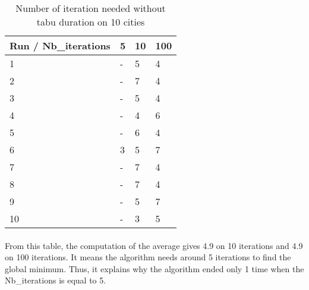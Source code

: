 \documentclass[12pt,oneside,a4paper]{article}
\begin{document}
\begin{table}[h]
    \centering
    \small
    \begin{tabular}{llll}
      \hline
      \multicolumn{1}{|l|}{\textbf{Run / Nb\_iterations}}& \multicolumn{1}{l|}{\textbf{5}} & \multicolumn{1}{l|}{\textbf{10}} & \multicolumn{1}{l|}{\textbf{100}}\\ \hline
      \multicolumn{1}{|l|}{1} & \multicolumn{1}{l|}{-}  & \multicolumn{1}{l|}{5}  & \multicolumn{1}{l|}{4}  \\ \hline
      \multicolumn{1}{|l|}{2} & \multicolumn{1}{l|}{-}  & \multicolumn{1}{l|}{7}  & \multicolumn{1}{l|}{4}  \\ \hline         
      \multicolumn{1}{|l|}{3} & \multicolumn{1}{l|}{-}  & \multicolumn{1}{l|}{5}  & \multicolumn{1}{l|}{4}  \\ \hline
      \multicolumn{1}{|l|}{4} & \multicolumn{1}{l|}{-}  & \multicolumn{1}{l|}{4}  & \multicolumn{1}{l|}{6}  \\ \hline
      \multicolumn{1}{|l|}{5} & \multicolumn{1}{l|}{-}  & \multicolumn{1}{l|}{6}  & \multicolumn{1}{l|}{4}  \\ \hline
      \multicolumn{1}{|l|}{6} & \multicolumn{1}{l|}{3}  & \multicolumn{1}{l|}{5}  & \multicolumn{1}{l|}{7}  \\ \hline
      \multicolumn{1}{|l|}{7} & \multicolumn{1}{l|}{-}  & \multicolumn{1}{l|}{7}  & \multicolumn{1}{l|}{4}  \\ \hline
      \multicolumn{1}{|l|}{8} & \multicolumn{1}{l|}{-}  & \multicolumn{1}{l|}{7}  & \multicolumn{1}{l|}{4}  \\ \hline
      \multicolumn{1}{|l|}{9} & \multicolumn{1}{l|}{-}  & \multicolumn{1}{l|}{5}  & \multicolumn{1}{l|}{7}  \\ \hline
      \multicolumn{1}{|l|}{10} & \multicolumn{1}{l|}{-}  & \multicolumn{1}{l|}{3}  & \multicolumn{1}{l|}{5}  \\ \hline
    \end{tabular}
    \caption{Number of iteration needed without tabu duration on 10 cities}
  \end{table}

\paragraph{}
    From this table, the computation of the average gives 4.9 on 10 iterations and 4.9 on 100 iterations.
    It means the algorithm needs around 5 iterations to find the global minimum. Thus, it explains why the algorithm
    ended only 1 time when the Nb\_iterations is equal to 5.
\end{document}
